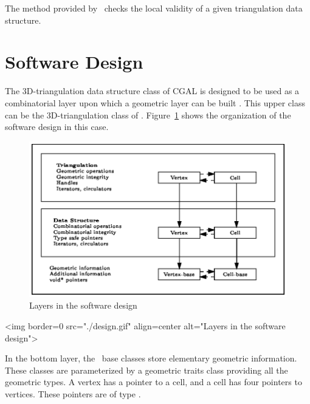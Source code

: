 The  method provided by \cgal\ checks the local
validity of a given triangulation data structure.
 
\section{Software Design}
\label{TDS3-sec-design}

The 3D-triangulation data structure class of CGAL is designed to be
used as a combinatorial layer upon which a geometric layer can be
built \cite{k-ddsps-98}. This upper class can be the 3D-triangulation
class of \cgal. Figure~\ref{TDS3-fig-layers} shows the organization of
the software design in this case.

\begin{ccTexOnly}
\begin{figure}[htbp]

\begin{center} 
\includegraphics{design.eps} 
\end{center}
\caption{Layers in the software design\label{TDS3-fig-layers}} 
\end{figure} 
\end{ccTexOnly}

\begin{ccHtmlOnly}
<img border=0 src="./design.gif" align=center alt="Layers in the software design">
\end{ccHtmlOnly}

In the bottom layer, the \cgal\ base classes store elementary
geometric information.  These classes are parameterized by a geometric
traits class providing all the geometric types. A vertex has a pointer
to a cell, and a cell has four pointers to vertices. These pointers
are of type .

